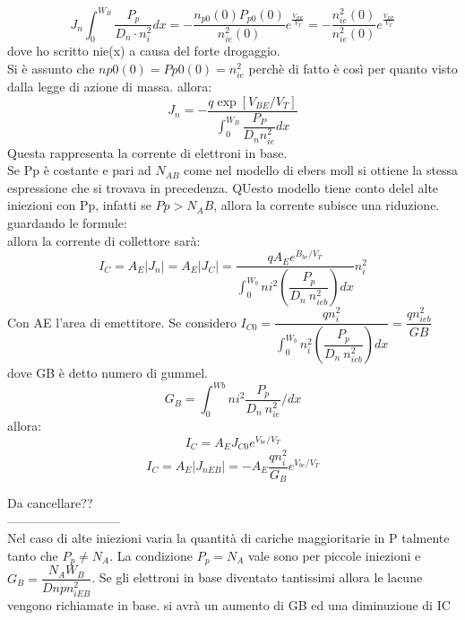 \begin{equation}
    J_n \int_0^{W_B} \dfrac{P_p}{D_n \cdot n_i^2}dx = -\dfrac{n_{p0}(0)P_{p0}(0)}{n_{ie}^2(0)} e^{\frac{V_{BE}}{V_T}}= -\dfrac{n_{ie}^2(0)}{n_{ie}^2(0)} e^{\frac{V_{BE}}{V_T}}
\end{equation}
dove ho scritto nie(x) a causa del forte drogaggio.\\
Si è assunto che $np0(0)=Pp0(0)=n_{ie}^2$ perchè di fatto è così per quanto visto dalla legge di azione di massa.
allora:
\begin{equation}
    J_n = - \dfrac{q \exp\left[ V_{BE}/V_T\right]}{\int_0^{W_B} \dfrac{P_P}{D_n n_{ie}^2}dx}
\end{equation}
Questa rappresenta la corrente di elettroni in base.\\
Se Pp è costante e pari ad $N_{AB}$ come nel modello di ebers moll si ottiene la stessa espressione che si trovava in precedenza. QUesto modello tiene conto delel alte iniezioni con Pp, infatti se $Pp>N_AB$, allora la corrente subisce una riduzione. guardando le formule:\\
allora la corrente di collettore sarà:
\begin{equation}
    I_C=A_E |J_{n}| =A_E |J_C|= \dfrac{qA_E e^{B_{be}/V_T}}{\int_0^{W_b}ni^2(\dfrac{P_p}{D_n \ n_{ieb}^2})dx}n_i^2
\end{equation}
Con AE l'area di emettitore. Se considero $I_{C0}=\dfrac{qn_i^2}{\int_0^{W_b}n_i^2(\dfrac{P_p}{D_n\ n_{ieb}^2})dx}=\dfrac{qn_{ieb}^2}{GB}$ dove GB è detto numero di gummel.
\begin{equation}
    G_B=\int_0^{Wb}ni^2\dfrac{P_p}{D_n\ n_{ie}^2}/dx
\end{equation}
allora:
\begin{equation}
    I_C=A_E J_{C0}e^{V_{be}/V_T}
\end{equation}
\begin{equation}
    I_C=A_E |J_{nEB}| = -A_E \dfrac{qn_i^2}{G_B}e^{V_{be}/V_T}
\end{equation}

Da cancellare??\\
---------------------------\\

Nel caso di alte iniezioni varia la quantità di cariche maggioritarie in P talmente tanto che $P_p \neq N_A$.
La condizione $P_p =N_A$ vale sono per piccole iniezioni e $G_B=\dfrac{N_A W_B}{D{np}n_{iEB}^2}$.
Se gli elettroni in base diventato tantissimi allora le lacune vengono richiamate in base. si avrà un aumento di GB ed una diminuzione di IC


